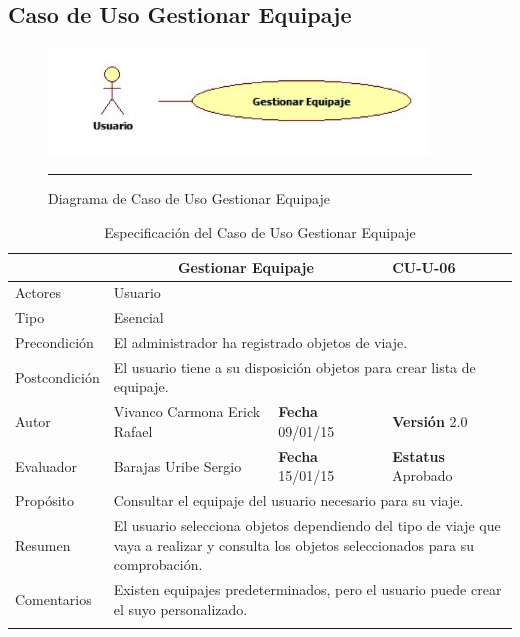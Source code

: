 \subsection{Caso de Uso Gestionar Equipaje}

\begin{figure}[htbp]
	\centering
		\includegraphics[width=0.9\textwidth]{Figuras/cuGestionarEquipajeU.png}
		\rule{30em}{0.5pt}
	\caption[Diagrama de Caso de Uso Gestionar Equipaje]{Diagrama de Caso de Uso Gestionar Equipaje}
	\label{fig:cuGestionarEquipajeU}
\end{figure}
\begin{longtable}[h!]{|p{2.5cm}|p{6.4cm}|p{2cm}|p{2cm}|}
	\hline
		\rowcolor[RGB]{51,153,255}{Caso de Uso}&\multicolumn{2}{c}{Gestionar Equipaje}&{\textbf{CU-U-06}}\\
	\hline
		{Actores}&\multicolumn{3}{p{11.2cm}|}{Usuario}\\
	\hline
		{Tipo}&\multicolumn{3}{p{11.2cm}|}{Esencial}\\
	\hline
		{Precondición}&\multicolumn{3}{p{11.2cm}|}{El administrador ha registrado objetos de viaje.}\\
	\hline
		{Postcondición}&\multicolumn{3}{p{11.2cm}|}{El usuario tiene a su disposición objetos para crear lista de equipaje.}\\
	\hline
		{Autor}&{Vivanco Carmona Erick Rafael}&{\textbf{Fecha} 09/01/15}&{\textbf{Versión} 2.0}\\
			\hline
		{Evaluador}&{Barajas Uribe Sergio}&{\textbf{Fecha} 15/01/15}&{\textbf{Estatus} Aprobado}\\
	\hline
		{Propósito}&\multicolumn{3}{p{11.2cm}|}{Consultar el equipaje del usuario necesario para su viaje.}\\
	\hline
		{Resumen}&\multicolumn{3}{p{11.2cm}|}{El usuario selecciona objetos dependiendo del tipo de viaje que vaya a realizar y consulta los objetos seleccionados para su comprobación.}\\	
	\hline
		{Comentarios}&\multicolumn{3}{p{11.2cm}|}{Existen equipajes predeterminados, pero el usuario puede crear el suyo personalizado.}\\
	\hline
	\caption[Especificación del Caso de Uso Gestionar Equipaje]{Especificación del Caso de Uso Gestionar Equipaje}
    	\label{tab:cuGestionarEquipajeU}
\end{longtable}

